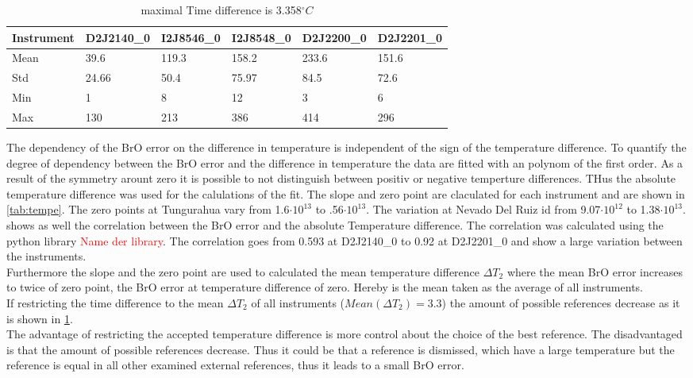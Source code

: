 \documentclass  [
  paper    = a4,
  BCOR     = 10mm,
  twoside,
  fontsize = 12pt,
  fleqn,
  toc      = bibnumbered,
  toc      = listofnumbered,
  numbers  = noendperiod,
  headings = normal,
  listof   = leveldown,
  version  = 3.03
]                                       {scrreprt}
\begin{document}
	\begin{table}
	\begin{tabular}{|p{2cm}|p{2cm}|p{2cm}|p{2cm}|p{2cm}|p{2cm}|}
		Instrument	&D2J2140\_0&I2J8546\_0& I2J8548\_0&D2J2200\_0&D2J2201\_0\\
		\toprule
		Mean&39.6&119.3&158.2&233.6&151.6\\
		\midrule
		Std&
		24.66&
		50.4&
		75.97&
		84.5&
		72.6\\
		\midrule
		Min&1&8&12&3 &6\\
		\midrule
		Max&130&213&386&414 &296\\
		\bottomrule
	\end{tabular}
	\caption{maximal Time difference is 3.358$^{\circ}C$}
	\label{tab:decTemp}
	\end{table}	
The dependency of the BrO error on the difference in temperature is independent of the sign of the temperature difference. To quantify the degree of dependency between the BrO error and the difference in temperature the data are fitted with an polynom of the first order. As a result of the symmetry arount zero it is possible to not distinguish between positiv or negative temperture differences. THus the absolute temperature difference was used for the calulations of the fit. The slope and zero point are claculated for each instrument and are shown in \cref{tab:tempe}. 
The zero points at Tungurahua vary from 1.6$\cdot10^{13}$ to .56$\cdot10^{13}$. The variation at Nevado Del Ruiz id from  9.07$\cdot10^{12}$ to 1.38$\cdot10^{13}$.\\
 shows as well the correlation between the BrO error and the absolute Temperature difference.
The correlation was calculated using the python library \textcolor{red}{Name der library}. The correlation goes from 0.593 at D2J2140\_0 to  0.92 at D2J2201\_0 and show a large variation between the instruments.\\
Furthermore the slope and the zero point are used to calculated the mean temperature difference $\Delta T_{2}$ where the mean BrO error increases to twice of zero point, the BrO error at temperature difference of zero.
Hereby is the mean taken as the average of all instruments.\\
If restricting the time difference to the mean $\Delta T_{2}$ of all instruments
($Mean(\Delta T_{2}) = 3.3$) the amount of possible references decrease as it is shown in \cref{tab:decTemp}.\\
The advantage of restricting the accepted temperature difference is more control about the choice of the best reference. The disadvantaged is that the amount of possible references decrease. Thus it could be that a reference is dismissed, which have a large temperature but the reference is equal in all other examined external references, thus it leads to a small BrO error.\\
\end{document}
